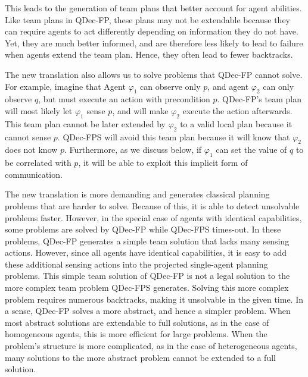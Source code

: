 \documentclass[letterpaper]{article} %
\theoremstyle{definition}
\begin{document}
This leads to the generation of team plans that better account for agent abilities. Like team plans in QDec-FP, these plans may not be extendable because they can require agents to act differently depending on information they do not have. Yet, they are much better informed, and are therefore less likely to lead to failure when agents extend the team plan. Hence, they often lead to fewer backtracks. %




The new translation also allows us to solve problems that QDec-FP cannot solve. For 
example, imagine
that Agent $\varphi_1$ can observe only $p$, and agent $\varphi_2$ can only observe $q$, but must execute an action with
precondition $p$. QDec-FP's team plan will most likely let $\varphi_1$ sense $p$, and
will make $\varphi_2$ execute the action afterwards. 
This team plan cannot be later extended by $\varphi_2$ to a valid local plan because it cannot sense $p$. QDec-FPS will avoid this team plan because it will know that $\varphi_2$ does not know $p$. Furthermore, as we discuss below, if $\varphi_1$ can set the value of $q$ to be correlated with $p$, it will be able to exploit this implicit form of communication.

The new translation is more demanding and generates classical planning problems that are harder to solve.
Because of this, it is able to detect unsolvable problems faster.
However, in the special case of agents with identical capabilities, 
some problems are solved
by QDec-FP while QDec-FPS times-out.
In these problems,  QDec-FP generates a simple team solution that lacks many sensing actions. However, since all agents have identical capabilities, it is easy to add these additional sensing actions
into the projected single-agent planning problems. This simple team solution of QDec-FP is not a legal solution to
the more complex team problem QDec-FPS generates. Solving this more complex problem requires numerous backtracks,
making it unsolvable in the given time.
In a sense, QDec-FP solves a more abstract,
and hence a simpler problem. When most abstract solutions are extendable to full solutions, as in the case of homogeneous agents, this is more efficient for large problems. When the problem's structure is more complicated, as in the case of heterogeneous agents, many solutions to the more abstract problem cannot be extended to a full solution.
\end{document}
